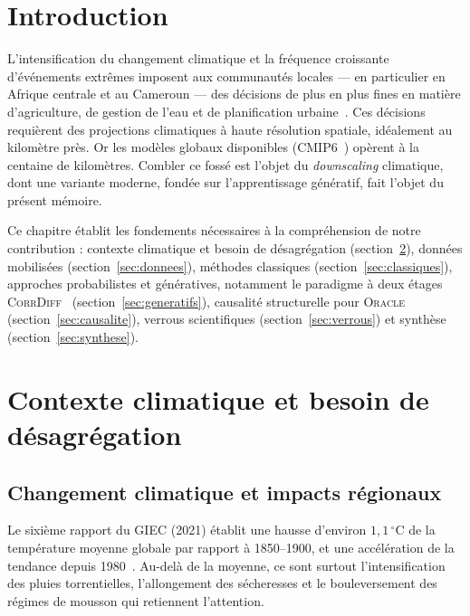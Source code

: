 \documentclass[14pt,a4paper,openany]{extreport}
\theoremstyle{definition}
\newcommand{\Oracle}{\textsc{Oracle}}
\newcommand{\CorrDiff}{\textsc{CorrDiff}}
\begin{document}
\vspace{1.5em}

\section{Introduction}
\label{sec:intro}

L'intensification du changement climatique et la fréquence croissante d'événements extrêmes imposent aux communautés locales --- en particulier en Afrique centrale et au Cameroun --- des décisions de plus en plus fines en matière d'agriculture, de gestion de l'eau et de planification urbaine~\cite{ipcc_ar6_2021}. Ces décisions requièrent des projections climatiques à haute résolution spatiale, idéalement au kilomètre près. Or les modèles globaux disponibles (CMIP6~\cite{eyring_cmip6_2016}) opèrent à la centaine de kilomètres. Combler ce fossé est l'objet du \emph{downscaling} climatique, dont une variante moderne, fondée sur l'apprentissage génératif, fait l'objet du présent mémoire.

Ce chapitre établit les fondements nécessaires à la compréhension de notre contribution : contexte climatique et besoin de désagrégation (section~\ref{sec:contexte}), données mobilisées (section~\ref{sec:donnees}), méthodes classiques (section~\ref{sec:classiques}), approches probabilistes et génératives, notamment le paradigme à deux étages \CorrDiff{}~\cite{mardani_corrdiff_2023} (section~\ref{sec:generatifs}), causalité structurelle pour \Oracle{} (section~\ref{sec:causalite}), verrous scientifiques (section~\ref{sec:verrous}) et synthèse (section~\ref{sec:synthese}).

\section{Contexte climatique et besoin de désagrégation}
\label{sec:contexte}

\subsection{Changement climatique et impacts régionaux}
\label{ssec:cc-regional}

Le sixième rapport du GIEC (2021) établit une hausse d'environ $1{,}1\,^{\circ}\mathrm{C}$ de la température moyenne globale par rapport à 1850--1900, et une accélération de la tendance depuis 1980~\cite{ipcc_ar6_2021}. Au-delà de la moyenne, ce sont surtout l'intensification des pluies torrentielles, l'allongement des sécheresses et le bouleversement des régimes de mousson qui retiennent l'attention.
\end{document}
